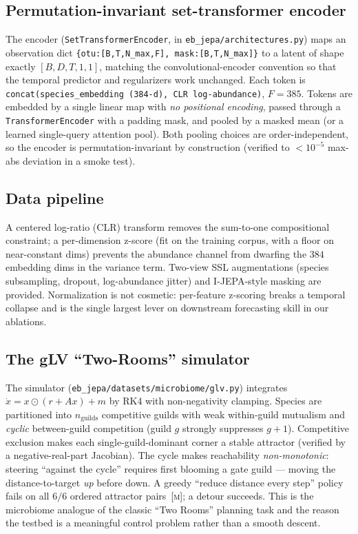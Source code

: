 \documentclass[11pt]{article}
\newcommand{\meas}{\textcolor{black}{\textsc{[m]}}}      %
\newcommand{\code}[1]{\texttt{#1}}
\begin{document}
\subsection{Permutation-invariant set-transformer encoder}
\label{sec:encoder}
The encoder (\code{SetTransformerEncoder}, in \code{eb\_jepa/architectures.py})
maps an observation dict \code{\{otu:[B,T,N\_max,F], mask:[B,T,N\_max]\}} to a
latent of shape exactly $[B, D, T, 1, 1]$, matching the convolutional-encoder
convention so that the temporal predictor and regularizers work unchanged. Each
token is \code{concat(species\_embedding (384-d), CLR log-abundance)},
$F{=}385$. Tokens are embedded by a single linear map with \emph{no positional
encoding}, passed through a \code{TransformerEncoder} with a padding mask, and
pooled by a masked mean (or a learned single-query attention pool). Both pooling
choices are order-independent, so the encoder is permutation-invariant by
construction (verified to $<10^{-5}$ max-abs deviation in a smoke test).

\subsection{Data pipeline}
A centered log-ratio (CLR) transform removes the sum-to-one compositional
constraint; a per-dimension z-score (fit on the training corpus, with a floor on
near-constant dims) prevents the abundance channel from dwarfing the
$384$ embedding dims in the variance term. Two-view SSL augmentations
(species subsampling, dropout, log-abundance jitter) and I-JEPA-style
masking are provided. Normalization is not cosmetic: per-feature z-scoring
breaks a temporal collapse and is the single largest lever on downstream
forecasting skill in our ablations.

\subsection{The gLV ``Two-Rooms'' simulator}
\label{sec:glv}
The simulator (\code{eb\_jepa/datasets/microbiome/glv.py}) integrates
$\dot x = x\odot(r + A x) + m$ by RK4 with non-negativity clamping. Species are
partitioned into $n_{\text{guilds}}$ competitive guilds with weak within-guild
mutualism and \emph{cyclic} between-guild competition (guild $g$ strongly
suppresses $g{+}1$). Competitive exclusion makes each single-guild-dominant
corner a stable attractor (verified by a negative-real-part Jacobian). The cycle
makes reachability \emph{non-monotonic}: steering ``against the cycle'' requires
first blooming a gate guild --- moving the distance-to-target \emph{up} before
down. A greedy ``reduce distance every step'' policy fails on all $6/6$ ordered
attractor pairs~\meas; a detour succeeds. This is the microbiome analogue of the
classic ``Two Rooms'' planning task and the reason the testbed is a meaningful
control problem rather than a smooth descent.
\end{document}
